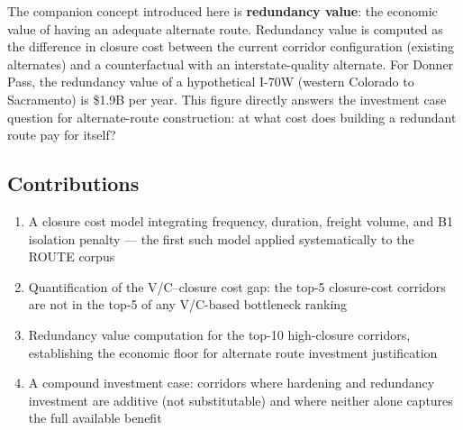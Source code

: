 The companion concept introduced here is \textbf{redundancy value}: the economic value
of having an adequate alternate route. Redundancy value is computed as the difference in
closure cost between the current corridor configuration (existing alternates) and a
counterfactual with an interstate-quality alternate. For Donner Pass, the redundancy
value of a hypothetical I-70W (western Colorado to Sacramento) is \$1.9B per year.
This figure directly answers the investment case question for alternate-route construction:
at what cost does building a redundant route pay for itself?

\subsection*{Contributions}

\begin{enumerate}
\item A closure cost model integrating frequency, duration, freight volume, and B1 isolation
penalty --- the first such model applied systematically to the ROUTE corpus
\item Quantification of the V/C--closure cost gap: the top-5 closure-cost corridors are
not in the top-5 of any V/C-based bottleneck ranking
\item Redundancy value computation for the top-10 high-closure corridors, establishing the
economic floor for alternate route investment justification
\item A compound investment case: corridors where hardening and redundancy investment are
additive (not substitutable) and where neither alone captures the full available benefit
\end{enumerate}
